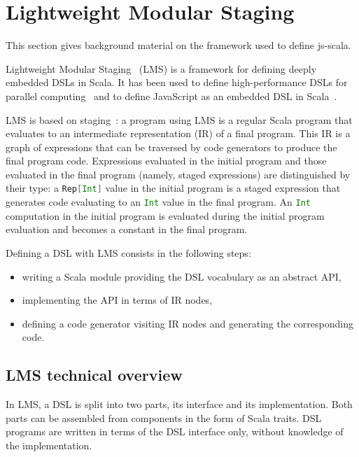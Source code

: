 \documentclass{llncs}
\newcommand{\code}[1]{\lstinline[language=Scala,columns=fixed,basicstyle=\footnotesize]|#1|}
\begin{document}
\section{Lightweight Modular Staging}
\label{sec:lms}

This section gives background material on the framework used to define js-scala.

Lightweight Modular Staging~\cite{Rompf12_LMSThesis,Rompf12_LMS} (LMS) is a framework for defining
deeply embedded DSLs in Scala. It has been used to define high-performance DSLs for parallel
computing~\cite{Brown11_Parallel} and to define JavaScript as an embedded DSL in
Scala~\cite{Kossakowski12_JsDESL}.

LMS is based on staging~\cite{Jorring1986_Staging}: a program using LMS is a regular Scala program
that evaluates to an intermediate representation (IR) of a final program. This IR is a graph of
expressions that can be traversed by code generators to produce the final program code. Expressions
evaluated in the initial program and those evaluated in the final program (namely, staged
expressions) are distinguished by their type: a \code{Rep[Int]} value in the initial program is a
staged expression that generates code evaluating to an \code{Int} value in the final program. An
\code{Int} computation in the initial program is evaluated during the initial program evaluation and
becomes a constant in the final program.

Defining a DSL with LMS consists in the following steps:

\begin{itemize}
 \item writing a Scala module providing the DSL vocabulary as an abstract API,
 \item implementing the API in terms of IR nodes,
 \item defining a code generator visiting IR nodes and generating the corresponding code.
\end{itemize}

\subsection{LMS technical overview}

In LMS, a DSL is split into two parts, its
interface and its implementation. Both parts can be assembled from
components in the form of Scala traits. DSL programs are written in
terms of the DSL interface only, without knowledge of the
implementation.
\end{document}
